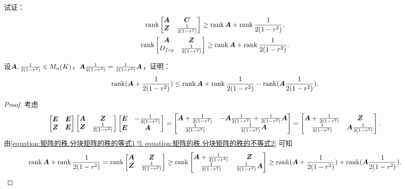 \begin{example}
试证：\begin{gather}
	\rank\begin{bmatrix} \A & \C \\ \z & \B \end{bmatrix} \geq \rank\A + \rank\B,
	\label{equation:矩阵的秩.分块矩阵的秩的不等式1} \\
	\rank\begin{bmatrix} \A & \z \\ \D & \B \end{bmatrix} \geq \rank\A + \rank\B.
	\label{equation:矩阵的秩.分块矩阵的秩的不等式2}
\end{gather}
\end{example}

\begin{example}
设\(\A,\B\in M_n(K)\)，\(\A\B=\B\A\)，证明：\[
	\rank(\A+\B)\leq\rank\A+\rank\B-\rank(\A\B).
\]
\begin{proof}
考虑\[
	\begin{bmatrix}
		\E & \E \\
		\z & \E
	\end{bmatrix}
	\begin{bmatrix}
		\A & \z \\
		\z & \B
	\end{bmatrix}
	\begin{bmatrix}
		\E & -\B \\
		\E & \A
	\end{bmatrix}
	= \begin{bmatrix}
		\A+\B & -\A\B+\B\A \\
		\B & \B\A
	\end{bmatrix}
	= \begin{bmatrix}
		\A+\B & \z \\
		\B & \A\B
	\end{bmatrix}.
\]
由\cref{equation:矩阵的秩.分块矩阵的秩的等式1,%
equation:矩阵的秩.分块矩阵的秩的不等式2} 可知\[
	\rank\A+\rank\B
	= \rank\begin{bmatrix}
		\A & \z \\
		\z & \B
	\end{bmatrix}
	\geq \rank\begin{bmatrix}
		\A+\B & \z \\
		\B & \B\A
	\end{bmatrix}
	\geq \rank(\A+\B) + \rank(\A\B).
	\qedhere
\]
\end{proof}
\end{example}

